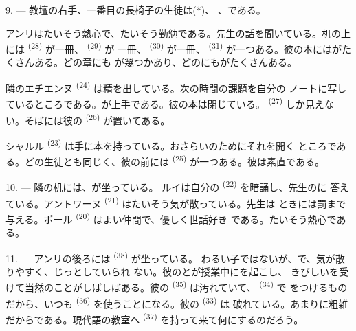
\VUsaut{2.4mm}

\VUsaut{3.0mm}

9. --- 教壇の右手、一番目の長椅子の生徒は(*)、
、である。

アンリはたいそう熱心で、たいそう勤勉である。先生の話を聞いている。机の上には
 \textsuperscript{(28)} が一冊、 \textsuperscript{(29)} が
一冊、 \textsuperscript{(30)} が一冊、
\textsuperscript{(31)} が一つある。彼の本にはがたくさんある。どの章にも
が幾つかあり、どのにもがたくさんある。

隣のエチエンヌ \textsuperscript{(24)} は精を出している。次の時間の課題を自分の
ノートに写しているところである。が上手である。彼の本は閉じている。
 \textsuperscript{(27)} しか見えない。そばには彼の
\textsuperscript{(26)} が置いてある。

シャルル \textsuperscript{(23)} は手に本を持っている。おさらいのためにそれを開く
ところである。どの生徒とも同じく、彼の前には
\textsuperscript{(25)} が一つある。彼は素直である。

10. --- 隣の机には、が坐っている。
ルイは自分の \textsuperscript{(22)} を暗誦し、先生のに
答えている。アントワーヌ \textsuperscript{(21)} はたいそう気が散っている。先生は
ときには罰まで与える。ポール \textsuperscript{(20)} はよい仲間で、優しく世話好き
である。たいそう熱心である。

\VUsaut{4.2mm}
\VUsaut{3.2mm}

11. --- アンリの後ろには \textsuperscript{(38)} が坐っている。
わるい子ではないが、で、気が散りやすく、じっとしていられ
ない。彼のとが授業中にを起こし、
きびしいを受けて当然のことがしばしばある。彼の
\textsuperscript{(35)} は汚れていて、 \textsuperscript{(34)} で
をつけるものだから、いつも
\textsuperscript{(36)} を使うことになる。彼の \textsuperscript{(33)} は
破れている。あまりに粗雑だからである。現代語の教室へ
\textsuperscript{(37)} を持って来て何にするのだろう。

